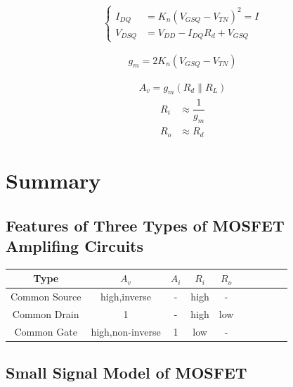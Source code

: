 \begin{equation*}
  \left\{
  \begin{aligned}
    I_{DQ} &= K_n \left( V_{GSQ} - V_{TN} \right)^2 = I\\
    V_{DSQ} &= V_{DD} - I_{DQ} R_d + V_{GSQ}
  \end{aligned}
  \right.
\end{equation*}

\begin{equation*}
  \begin{aligned}
    g_m = 2 K_n \left( V_{GSQ} - V_{TN} \right)
  \end{aligned}
\end{equation*}

\begin{equation*}
  \begin{aligned}
    A_v = g_m \left( R_d \parallel R_L \right)
  \end{aligned}
\end{equation*}
\begin{equation*}
  \begin{aligned}
    R_i &\approx \dfrac{1}{g_m} \\
    R_o &\approx R_d
  \end{aligned}
\end{equation*}

\section{Summary}

\subsection{Features of Three Types of MOSFET Amplifing Circuits}

\begin{table}[htbp]
  \centering
  \begin{tabular}{|Sc|Sc|Sc|Sc|Sc|}
    \hline
    Type & $A_v$ & $A_i$ & $R_i$ & $R_o$ \\
    \hline
    Common Source & high,inverse & - & high & - \\
    \hline
    Common Drain & 1 & - & high & low \\
    \hline
    Common Gate & high,non-inverse & 1 & low & - \\
    \hline
  \end{tabular}
\end{table}

\subsection{Small Signal Model of MOSFET}


